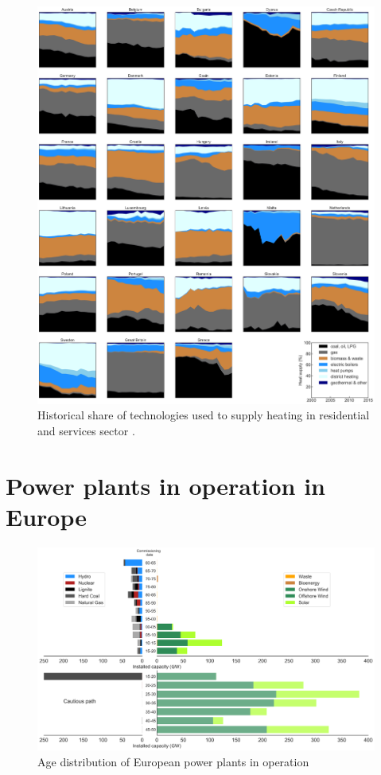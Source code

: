 \documentclass[3p]{elsarticle} %
\begin{document}
\begin{figure}[!h]
\centering
\includegraphics[width=\textwidth]{figures/heating_historical.png}
\caption{Historical share of technologies used to supply heating in residential and services sector \cite{IDEES}. } \label{fig_historical_heating} 
\end{figure}

\section{Power plants in operation in Europe}

\begin{figure}[!h]
\centering
\includegraphics[width=\textwidth]{figures/age_distribution.png}
\caption{Age distribution of European power plants in operation\cite{powerplantmatching, IRENA_2019}} \label{fig_age_distribution} 
\end{figure}
\end{document}
